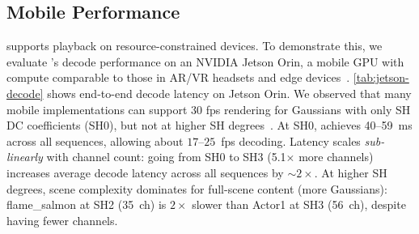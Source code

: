 

\subsection{Mobile Performance}\label{sec:mobile-performance}

\gsnfs{} supports \dgs{} playback on resource-constrained devices.
%
To demonstrate this, we evaluate \gsnfs{}'s decode performance on an NVIDIA Jetson Orin, a mobile GPU with compute comparable to those in AR/VR headsets and edge devices~\cite{nvidia_jetson_orin}.
%
\cref{tab:jetson-decode} shows end-to-end decode latency on Jetson Orin.
%
We observed that many \gs{} mobile implementations can support 30 fps \gs{} rendering for Gaussians with only SH DC coefficients (SH0), but not at higher SH degrees~\cite{v3volumetric}.
%
At SH0, \gsnfs{} achieves 40--59~ms across all sequences, allowing about $17$--$25$~fps decoding.
%
Latency scales \emph{sub-linearly} with channel count: going from SH0 to SH3 (5.1$\times$ more channels) increases average decode latency across all sequences by ${\sim2}\times$.
%
At higher SH degrees, scene complexity dominates for full-scene content (more Gaussians): flame\_salmon at SH2 (35~ch) is $2\times$ slower than Actor1 at SH3 (56~ch), despite having fewer channels.

